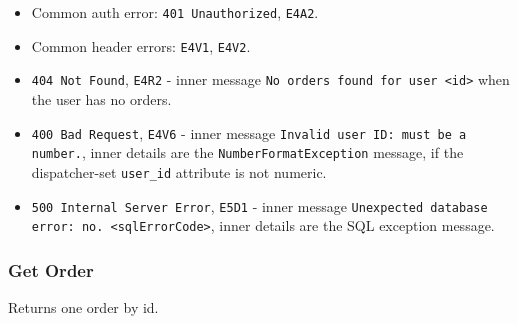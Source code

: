 \begin{itemize}[nosep]
\begin{itemize}[nosep]
\item Common auth error: \texttt{401 Unauthorized}, \texttt{E4A2}.
\item Common header errors: \texttt{E4V1}, \texttt{E4V2}.
\item \texttt{404 Not Found}, \texttt{E4R2} - inner message \texttt{No orders found for user <id>} when the user has no orders.
\item \texttt{400 Bad Request}, \texttt{E4V6} - inner message \texttt{Invalid user ID: must be a number.}, inner details are the \texttt{NumberFormatException} message, if the dispatcher-set \texttt{user\_id} attribute is not numeric.
\item \texttt{500 Internal Server Error}, \texttt{E5D1} - inner message \texttt{Unexpected database error: no. <sqlErrorCode>}, inner details are the SQL exception message.
\end{itemize}

\end{itemize}

\subsubsection*{Get Order}

Returns one order by id.

